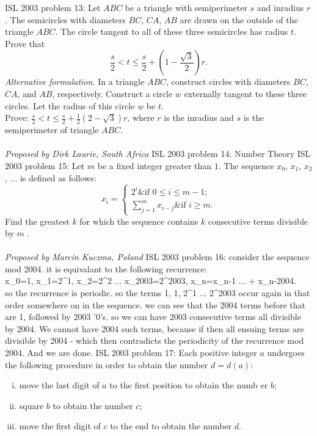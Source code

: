 ISL 2003 problem 13:  Let $ABC$ be a triangle with semiperimeter $s$ and inradius $r$. The semicircles with diameters $BC$, $CA$, $AB$ are drawn on the outside of the triangle $ABC$. The circle tangent to all of these three semicircles has radius $t$. Prove that
\[ \frac{s}{2}<t\le\frac{s}{2}+\left(1-\frac{\sqrt{3}}{2}\right)r. \]
\textit{Alternative formulation.} In a triangle $ABC$, construct circles with diameters $BC$, $CA$, and $AB$, respectively. Construct a circle $w$ externally tangent to these three circles. Let the radius of this circle $w$ be $t$. \\
Prove: $\frac{s}{2}<t\le\frac{s}{2}+\frac12\left(2-\sqrt3\right)r$, where $r$ is the inradius and $s$ is the semiperimeter of triangle $ABC$. \\\\
\textit{Proposed by Dirk Laurie, South Africa} 
ISL 2003 problem 14:  Number Theory 
ISL 2003 problem 15:  Let $m$ be a fixed integer greater than $1$. The sequence $x_0$, $x_1$, $x_2$, $\ldots$ is defined as follows:
\[
x_i =
\begin{cases}2^i\&\text{if }0\leq i \leq m - 1;\\\sum_{j=1}^mx_{i-j}\&\text{if }i\geq m.\end{cases}
\]
Find the greatest $k$ for which the sequence contains $k$ consecutive terms divisible by $m$ . \\\\
\textit{Proposed by Marcin Kuczma, Poland} 
ISL 2003 problem 16:  consider the sequence mod 2004. it is equivalant to the following recurrence: \\
x_0=1, x_1=2^1, x_2=2^2 ... x_2003=2^2003, x_n=x_n-1 ... + x_n-2004. \\
so the recurrence is periodic. so the terms {1, 1, 2^1 ... 2^2003} occur again in that order somewhere on in the sequence. we can see that the 2004 terms before that are 1, followed by 2003 '0's. so we can have 2003 consecutive terms all divisible by 2004. We cannot have 2004 such terms, because if then all ensuing terms are divisible by 2004 - which then contradicts the periodicity of the recurrence mod 2004. And we are done. 
ISL 2003 problem 17:  Each positive integer $a$ undergoes the following procedure in order to obtain the number $d = d\left(a\right)$:
\begin{enumerate}[(i)]
  \item move the last digit of $a$ to the first position to obtain the numb er $b$;
  \item square $b$ to obtain the number $c$;
  \item move the first digit of $c$ to the end to obtain the number $d$.
\end{enumerate}
